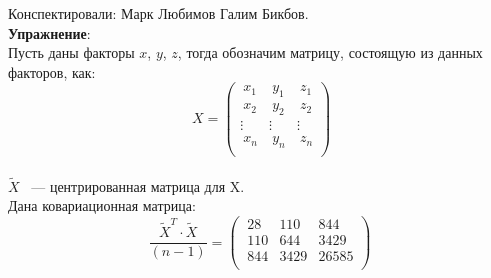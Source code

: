 \documentclass[12pt]{article} %
\theoremstyle{definition} %
\begin{document}
Конспектировали: Марк Любимов Галим Бикбов.\\

\textbf{Упражнение}:\\
Пусть даны факторы $x$, $y$, $z$, тогда обозначим матрицу, состоящую из данных факторов, как:
\[
\ X = \begin{pmatrix}
           \ x_{1} & \ y_{1} &\ z_{1}\\
           \ x_{2} & \ y_{2} &\ z_{2}\\
           \vdots & \vdots &  \vdots\\
           \ x_{n} & \ y_{n} &\ z_{n}\\
         \end{pmatrix}
         \]\\
$\widetilde{X}$ ~--- центрированная матрица для X.\\
Дана ковариационная матрица:
\[\frac{\widetilde{X}^T\cdot\widetilde{X}}{(n-1)} = \begin{pmatrix}
            \ 28 & 110 & 844\\
            \ 110 & 644 & 3429 \\ 
            \ 844 & 3429 & 26585\\
        \end{pmatrix}
\]
\end{document}
